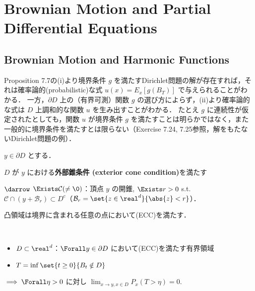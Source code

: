\documentclass{jsarticle}
\title{}
\author{}
\date{
}
\begin{document}
\setcounter{section}{6}
\section{Brownian Motion and Partial Differential Equations}
\setcounter{subsection}{1}
\subsection{Brownian Motion and Harmonic Functions}

Proposition 7.7の(i)より境界条件 $g$ を満たすDirichlet問題の解が存在すれば，それは確率論的(probabilistic)な式 $u(x)=E_x[g(B_T)]$ で与えられることがわかる．
一方，$\partial D$ 上の（有界可測）関数 $g$ の選び方によらず，(ii)より確率論的な式は $D$ 上調和的な関数 $u$ を生み出すことがわかる．
たとえ $g$ に連続性が仮定されたとしても，関数 $u$ が境界条件 $g$ を満たすことは明らかではなく，また一般的に境界条件を満たすとは限らない（Exercise 7.24, 7.25参照，解をもたないDirichlet問題の例）．

\begin{shadebox}
    \begin{df*}
        $y\in\partial D$ とする．
        
        $D$ が $y$ における\textbf{外部錐条件 (exterior cone condition)}を満たす
        
        $\darrow$
        $\Exists \mathcal{C}(\neq\0)$：頂点 $y$ の開錐, $\Exists r>0$ s.t. $\mathcal{C}\cap (y+\mathcal{B}_r)\subset D^c$（$\mathcal{B}_{r}=\set{z\in\real^d}{\abs{z}<r}$）．
    \end{df*}
\end{shadebox}

\begin{ex*}
    凸領域は境界に含まれる任意の点において(ECC)を満たす．
\end{ex*}


\setcounter{thm}{8}
\begin{shadebox}
    \begin{lem}\label{thm:709}~
        \begin{itemize}
            \item $D\subset \real^d$：$\Forall y\in\partial D$ において(ECC)を満たす有界領域
            \item $T=\inf\set{t\ge0}{B_t\notin D}$
        \end{itemize}
    
        $\implies \Forall \eta>0$ に対し $\lim_{x\to y, x\in D}P_x(T>\eta) = 0.$
    \end{lem}
\end{shadebox}
\end{document}
